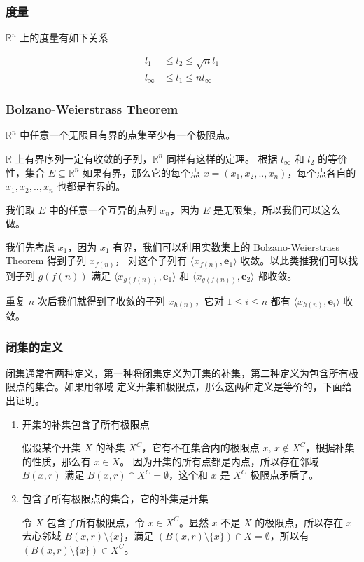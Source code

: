 \documentclass[12pt,a4paper]{ctexart}
\begin{document}
\subsubsection{度量}

$\mathbb{R}^n$ 上的度量有如下关系

\begin{align*}
    l_1 & \le l_2 \le \sqrt{n} l_1 \\
    l_{\infty} & \le l_1 \le n l_{\infty}
\end{align*}

\subsubsection{Bolzano-Weierstrass Theorem}

$\mathbb{R}^n$ 中任意一个无限且有界的点集至少有一个极限点。

$\mathbb{R}$ 上有界序列一定有收敛的子列，$\mathbb{R}^n$ 同样有这样的定理。
根据 $l_{\infty}$ 和 $l_2$ 的等价性，集合 $E \subseteq \mathbb{R}^n$ 如果有界，那么它的每个点 $x = (x_1,x_2,..,x_n)$，每个点各自的 $x_1,x_2,..,x_n$ 也都是有界的。

我们取 $E$ 中的任意一个互异的点列 $x_n$，因为 $E$ 是无限集，所以我们可以这么做。

我们先考虑 $x_1$，因为 $x_1$ 有界，我们可以利用实数集上的 Bolzano-Weierstrass Theorem 得到子列 $x_{f(n)}$，
对这个子列有 $\langle x_{f(n)}, \mathbf{e}_1 \rangle$ 收敛。以此类推我们可以找到子列 $g(f(n))$ 满足
$\langle x_{g(f(n))}, \mathbf{e}_1 \rangle$ 和 $\langle x_{g(f(n))}, \mathbf{e}_2 \rangle$ 都收敛。

重复 $n$ 次后我们就得到了收敛的子列 $x_{h(n)}$，它对 $1 \le i \le n$ 都有 $\langle x_{h(n)}, \mathbf{e}_i\rangle$ 收敛。

\subsubsection{闭集的定义}

闭集通常有两种定义，第一种将闭集定义为开集的补集，第二种定义为包含所有极限点的集合。如果用邻域
定义开集和极限点，那么这两种定义是等价的，下面给出证明。

\begin{enumerate}
    \item 开集的补集包含了所有极限点

    假设某个开集 $X$ 的补集 $X^C$，它有不在集合内的极限点 $x,\, x \notin X^C$，根据补集的性质，那么有 $x \in X$。
    因为开集的所有点都是内点，所以存在邻域 $B(x, r)$ 满足 $B(x,r) \cap X^C = \emptyset$，这个和 $x$ 是 $X^C$ 极限点矛盾了。

    \item 包含了所有极限点的集合，它的补集是开集

    令 $X$ 包含了所有极限点，令 $x \in X^C$。显然 $x$ 不是 $X$ 的极限点，所以存在 $x$ 去心邻域 $B(x, r) \setminus \{ x \}$，满足
    $ \left( B(x, r) \setminus \{ x \} \right) \cap X = \emptyset$，所以有 $\left( B(x, r) \setminus \{ x \} \right) \in X^C$。
\end{enumerate}
\end{document}
